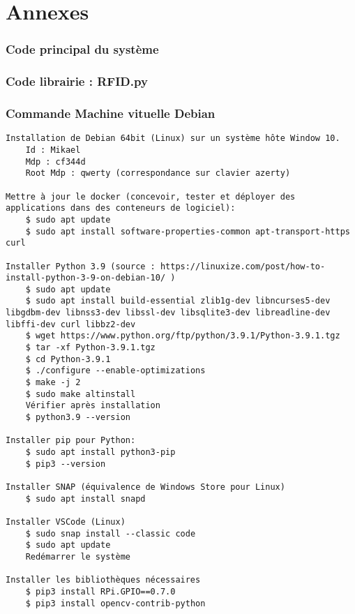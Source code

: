 \documentclass[a4paper]{report}
\begin{document}
    \appendix{}
    
    \part{Annexes}
    
        \section{Code principal du système}
        \section{Code librairie : RFID.py}
        
        \section{Commande Machine vituelle Debian} \label{sec:cde machine virtuelle}

    \begin{verbatim}
Installation de Debian 64bit (Linux) sur un système hôte Window 10.
    Id : Mikael
    Mdp : cf344d
    Root Mdp : qwerty (correspondance sur clavier azerty)

Mettre à jour le docker (concevoir, tester et déployer des applications dans des conteneurs de logiciel):
    $ sudo apt update
    $ sudo apt install software-properties-common apt-transport-https curl

Installer Python 3.9 (source : https://linuxize.com/post/how-to-install-python-3-9-on-debian-10/ )
    $ sudo apt update
    $ sudo apt install build-essential zlib1g-dev libncurses5-dev libgdbm-dev libnss3-dev libssl-dev libsqlite3-dev libreadline-dev libffi-dev curl libbz2-dev
    $ wget https://www.python.org/ftp/python/3.9.1/Python-3.9.1.tgz
    $ tar -xf Python-3.9.1.tgz
    $ cd Python-3.9.1
    $ ./configure --enable-optimizations
    $ make -j 2
    $ sudo make altinstall
    Vérifier après installation
    $ python3.9 --version

Installer pip pour Python:
    $ sudo apt install python3-pip
    $ pip3 --version

Installer SNAP (équivalence de Windows Store pour Linux)
    $ sudo apt install snapd

Installer VSCode (Linux)
    $ sudo snap install --classic code
    $ sudo apt update
    Redémarrer le système

Installer les bibliothèques nécessaires
    $ pip3 install RPi.GPIO==0.7.0
    $ pip3 install opencv-contrib-python
    
    \end{verbatim}
\end{document}
